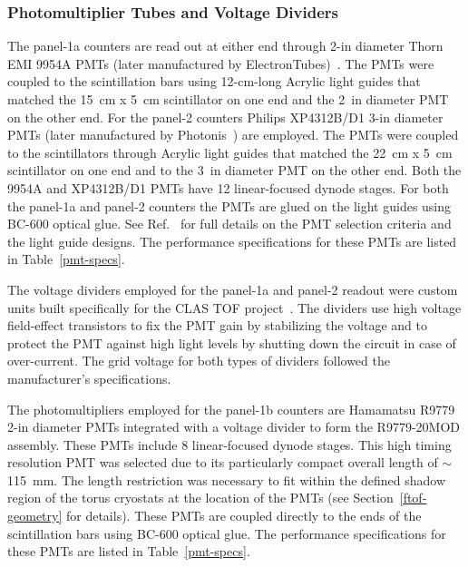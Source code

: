 \documentclass{elsart}
\begin{document}
\subsubsection{Photomultiplier Tubes and Voltage Dividers}

The panel-1a counters are read out at either end through 2-in diameter Thorn EMI 9954A PMTs (later
manufactured by ElectronTubes)~\cite{et-ref}. The PMTs were coupled to the scintillation bars using
12-cm-long Acrylic light guides that matched the 15~cm x 5~cm scintillator on one end and the 2~in
diameter PMT on the other end.  For the panel-2 counters Philips XP4312B/D1 3-in diameter PMTs (later
manufactured by Photonis~\cite{photonis}) are employed. The PMTs were coupled to the scintillators through
Acrylic light guides that matched the 22~cm x 5~cm scintillator on one end and to the 3~in diameter PMT
on the other end. Both the 9954A and XP4312B/D1 PMTs have 12 linear-focused dynode stages. For both
the panel-1a and panel-2 counters the PMTs are glued on the light guides using BC-600 optical glue. See
Ref.~\cite{tof-nim} for full details on the PMT selection criteria and the light guide designs. The
performance specifications for these PMTs are listed in Table~\ref{pmt-specs}.

The voltage dividers employed for the panel-1a and panel-2 readout were custom units built specifically for
the CLAS TOF project~\cite{tof-nim}. The dividers use high voltage field-effect transistors to fix the PMT
gain by stabilizing the voltage and to protect the PMT against high light levels by shutting down the circuit in
case of over-current. The grid voltage for both types of dividers followed the manufacturer's specifications.

The photomultipliers employed for the panel-1b counters are Hamamatsu R9779 2-in diameter PMTs integrated
with a voltage divider to form the R9779-20MOD assembly. These PMTs include 8 linear-focused dynode stages.
This high timing resolution PMT was selected due to its particularly compact overall length of $\sim$115~mm.
The length restriction was necessary to fit within the defined shadow region of the torus cryostats at the location
of the PMTs (see Section~\ref{ftof-geometry} for details). These PMTs are coupled directly to the ends of the
scintillation bars using BC-600 optical glue. The performance specifications for these PMTs are listed in
Table~\ref{pmt-specs}.
\end{document}
